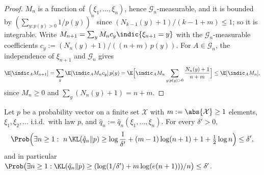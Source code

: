 \begin{proof}
\leanok
{}
$M_n$ is a function of $(\xi_1, \dots, \xi_n)$, hence $\mathcal G_n$-measurable, and it is bounded
by $(\sum_{y : p(y) > 0} 1/p(y))^n$ since $(N_{k-1}(y) + 1)/(k - 1 + m) \le 1$; so it is
integrable. Write $M_{n+1} = \sum_y M_n c_y \indic\{\xi_{n+1} = y\}$ with the
$\mathcal G_n$-measurable coefficients $c_y := (N_n(y) + 1)/((n + m)\, p(y))$. For
$A \in \mathcal G_n$, the independence of $\xi_{n+1}$ and $\mathcal G_n$ gives
\[
  \E[\indic_A M_{n+1}] = \sum_y \E[\indic_A M_n c_y]\, p(y)
  = \E\Big[\indic_A M_n \sum_{y : p(y) > 0} \frac{N_n(y) + 1}{n + m}\Big] \le \E[\indic_A M_n] ,
\]
since $M_n \ge 0$ and $\sum_y (N_n(y) + 1) = n + m$.
\end{proof}

\begin{lemma}\label{lem:empirical_kl_time_uniform}
\leanok
{}
Let $p$ be a probability vector on a finite set $\mathcal X$ with $m := \abs{\mathcal X} \ge 1$
elements, $\xi_1, \xi_2, \dots$ i.i.d.\ with law $p$, and $\hat q_n := \hat q_n(\xi_1, \dots, \xi_n)$.
For every $\delta' > 0$,
\[
  \Prob\Big( \exists n \ge 1 :\ n\, \KL(\hat q_n \| p) \ge \log\frac1{\delta'} + (m - 1)\log(n + 1) + 1 + \tfrac12 \log n \Big) \le \delta' ,
\]
and in particular
$\Prob\big( \exists n \ge 1 : \KL(\hat q_n \| p) \ge (\log(1/\delta') + m \log(e(n + 1)))/n \big) \le \delta'$.
\end{lemma}

